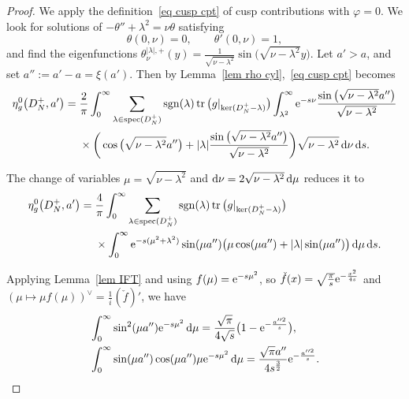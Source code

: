 \documentclass[10pt,a4paper]{amsart}
\numberwithin{equation}{section}
\DeclareMathOperator{\tr}{tr}
\DeclareMathOperator{\spec}{spec}
\DeclareMathOperator{\sgn}{sgn}
\begin{document}
\begin{proof}We apply the definition~\eqref{eq cusp cpt} of cusp contributions with $\varphi = 0$.
We look for solutions of $-\theta''+\lambda^2=\nu\theta $ satisfying
\[
\theta(0,\nu)=0,\qquad \theta'(0,\nu)=1,
\]
 and find the eigenfunctions $\theta^{|\lambda|,+}_{\nu}(y) =\frac{1}{\sqrt{\nu-\lambda^2}}\sin\big(\sqrt{\nu-\lambda^2}y\big)$.
 Let $a'>a$, and set $a'':= {a'-a = \xi(a')}$. Then
 by Lemma~\ref{lem rho cyl},~\eqref{eq cusp cpt} becomes
\begin{align}
\eta^{0}_g\big(D_N^+, a'\big) ={}&\frac{2}{\pi} \int_{0}^{\infty}
\sum_{\lambda \in \spec(D_N^+)} \sgn(\lambda)\tr\big(g|_{\ker(D_N^+ - \lambda)}\big)
\int_{\lambda^2}^{\infty}
{\rm e}^{-s\nu}
\frac{\sin\big(\sqrt{\nu-\lambda^2}a''\big)}{\sqrt{\nu-\lambda^2}}\nonumber
\\
 &\times\bigg( \cos\big(\sqrt{\nu-\lambda^2}a''\big) +|\lambda| \frac{\sin\big(\sqrt{\nu-\lambda^2}a''\big)}{\sqrt{\nu-\lambda^2}}
 \bigg)\sqrt{\nu-\lambda^2}\, {\rm d}\nu \, {\rm d}s.
 \label{eq cusp contr cyl 1}
 \end{align}

The change of variables $\mu=\sqrt{\nu-\lambda^2}$ and ${\rm d}\nu=2\sqrt{\nu-\lambda^2}\,{\rm d}\mu$ reduces it to
\begin{align*}
\begin{split}
\eta^{0}_g\big(D_N^+, a'\big) ={}&\frac{4}{\pi} \int_{0}^{\infty}
\sum_{\lambda \in \spec(D_N^+)} \sgn(\lambda)\tr\big(g|_{\ker(D_N^+ - \lambda)}\big)
\\
&\times\int_{0}^{\infty}{\rm e}^{-s(\mu^2+\lambda^2)}\sin(\mu a'')
 \big( \mu\cos(\mu a'') +|\lambda| \sin(\mu a'') \big)\,{\rm d}\mu \, {\rm d}s.
 \end{split}
\end{align*}



Applying Lemma~\ref{lem IFT} and using $f(\mu)={\rm e}^{-s\mu^2}$, so $\check f(x)=\sqrt{\frac{\pi}{s}}{\rm e}^{-\frac{x^2}{4s}}$ and $(\mu \mapsto \mu f(\mu))^{\vee}=\frac{1}{i}(\check{f})'$, we have
\begin{align*}
&\int_0^{\infty}\sin^2(\mu a''){\rm e}^{-s\mu^2}\, {\rm d}\mu =\frac{\sqrt{\pi}}{4\sqrt{s}}\big(1-{\rm e}^{-\frac{a''^2}{s}}\big),
\\
&\int_0^{\infty}\sin(\mu a'')\cos(\mu a'')\mu {\rm e}^{-s\mu^2}\, {\rm d}\mu=\frac{\sqrt{\pi} a''}{4s^{\frac32}}{\rm e}^{-\frac{a''^2}{s}}.
\end{align*}


\end{proof}
\end{document}
